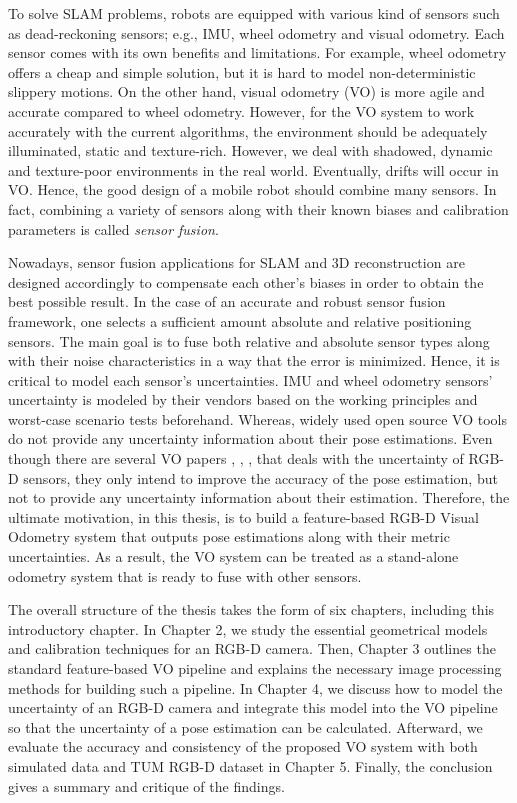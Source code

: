 \documentclass[a4paper]{report}
\numberwithin{figure}{section}
\begin{document}
To solve SLAM problems, robots are equipped with various kind of sensors 
such as 
dead-reckoning sensors; e.g., IMU, wheel odometry and visual odometry. 
Each sensor comes with its own benefits and limitations. For example, 
wheel odometry offers a cheap and simple solution, but 
it is hard to model non-deterministic slippery motions. 
On the other hand, visual odometry (VO) is more agile and accurate compared to 
wheel odometry. However, 
for the VO system to work
accurately with the current algorithms, the environment should be adequately 
illuminated, static and
texture-rich.  However, we deal with shadowed, dynamic and
texture-poor environments in the real world. Eventually, drifts will occur in 
VO. 
Hence, the good
design of a mobile robot should combine many sensors.
In fact, combining a variety of sensors 
along with their known biases and calibration parameters is called 
\textit{sensor fusion}.

Nowadays, sensor fusion applications for SLAM and 3D reconstruction are designed 
accordingly to compensate each other's biases in order to obtain the best 
possible result. In the case of an accurate and robust sensor fusion framework, 
one selects a sufficient amount absolute and relative positioning sensors. 
The main goal is to fuse both relative and absolute sensor types 
along with their noise characteristics in a way that the error is minimized. 
Hence, it is critical to model each sensor's uncertainties. 
IMU and wheel odometry sensors' uncertainty is modeled by their vendors 
based on the working principles and worst-case scenario tests beforehand.
Whereas, widely used open source VO tools do not provide any uncertainty information 
about their pose estimations. Even though there are several VO papers 
\parencite{Endres2014}, \parencite{Konolige08}, \parencite{Di2016a}, 
\parencite{Belter2018a}
that deals with the uncertainty of RGB-D sensors, they only intend to 
improve the accuracy of the pose estimation, but not to provide any 
uncertainty 
information about their estimation. Therefore, the ultimate motivation, in 
this thesis, is to build 
a feature-based RGB-D Visual Odometry system that outputs pose estimations 
along with their metric uncertainties.
As a result, the VO system can be treated as a stand-alone 
odometry system that is ready to fuse with other sensors.


The overall structure of the thesis takes the form of six chapters, including
this introductory chapter. In Chapter 2, we study the essential geometrical
models and calibration techniques for an RGB-D camera. Then, Chapter 3 outlines
the standard feature-based VO pipeline and explains the necessary image
processing methods for building such a pipeline. In Chapter 4, we discuss how
to model the uncertainty of an RGB-D camera and integrate this model into the
VO pipeline so that the uncertainty of a pose estimation can be calculated.
Afterward, we evaluate the accuracy and consistency of the proposed VO system
with both simulated data and TUM RGB-D dataset in Chapter 5. Finally, the
conclusion gives a summary and critique of the findings.
\end{document}
